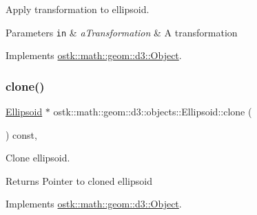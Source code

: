 Apply transformation to ellipsoid. 


\begin{DoxyParams}[1]{Parameters}
\mbox{\tt in}  & {\em a\+Transformation} & A transformation \\
\hline
\end{DoxyParams}


Implements \hyperlink{classostk_1_1math_1_1geom_1_1d3_1_1_object_ae9194dd6d2bb4df09292ffc84dccdb1d}{ostk\+::math\+::geom\+::d3\+::\+Object}.

\mbox{\label{classostk_1_1math_1_1geom_1_1d3_1_1objects_1_1_ellipsoid_a00899cd0b86395c4beef6947497bfe82}} 
\subsubsection{\texorpdfstring{clone()}{clone()}}
{\footnotesize\ttfamily \hyperlink{classostk_1_1math_1_1geom_1_1d3_1_1objects_1_1_ellipsoid}{Ellipsoid} $\ast$ ostk\+::math\+::geom\+::d3\+::objects\+::\+Ellipsoid\+::clone (\begin{DoxyParamCaption}{ }\end{DoxyParamCaption}) const\hspace{0.3cm}{\ttfamily [override]}, {\ttfamily [virtual]}}



Clone ellipsoid. 

\begin{DoxyReturn}{Returns}
Pointer to cloned ellipsoid 
\end{DoxyReturn}


Implements \hyperlink{classostk_1_1math_1_1geom_1_1d3_1_1_object_a676013f9555f6492687f9809b2db887b}{ostk\+::math\+::geom\+::d3\+::\+Object}.

\mbox{\label{classostk_1_1math_1_1geom_1_1d3_1_1objects_1_1_ellipsoid_a65985adadbc7de1e595c7ed326725f92}} 
